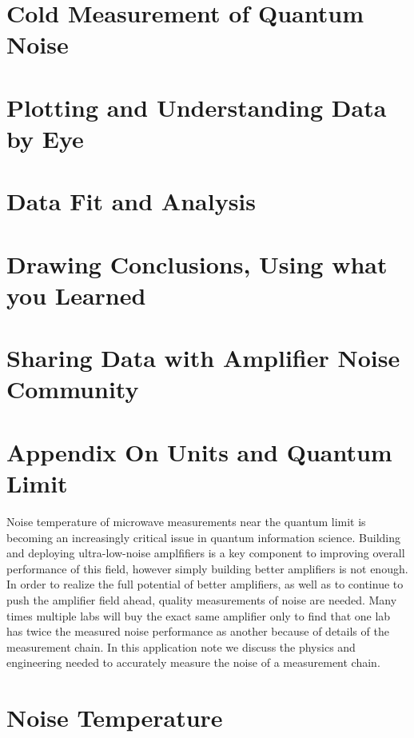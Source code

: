 \documentclass[11pt]{article}
\begin{document}
\section{
Cold Measurement of Quantum Noise}


\section{
Plotting and Understanding Data by Eye}


\section{
Data Fit and Analysis}


\section{
Drawing Conclusions, Using what you Learned}



\section{
Sharing Data with Amplifier Noise Community}


\section{
Appendix On Units and Quantum Limit}





	Noise temperature of microwave measurements near the quantum limit is becoming an increasingly critical issue in quantum information science.  Building and deploying ultra-low-noise amplfifiers is a key component to improving overall performance of this field, however simply building better amplifiers is not enough.  In order to realize the full potential of better amplifiers, as well as to continue to push the amplifier field ahead, quality measurements of noise are needed.   Many times multiple labs will buy the exact same amplifier only to find that one lab has twice the measured noise performance as another because of details of the measurement chain.  In this application note we discuss the physics and engineering needed to accurately measure the noise of a measurement chain.


\section{
Noise Temperature}
\end{document}
